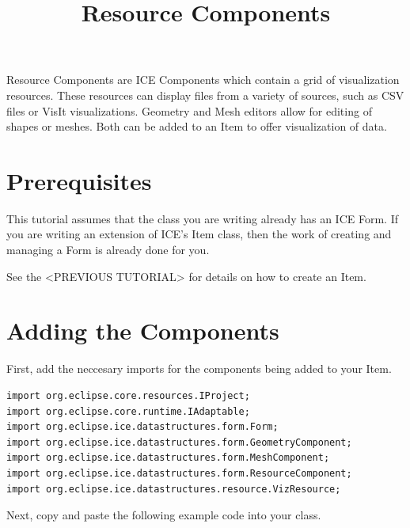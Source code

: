 \documentclass{article}
\begin{document}
\title{Resource Components}

Resource Components are ICE Components which contain a grid of visualization
resources. These resources can display files from a variety of sources,
such as CSV files or VisIt visualizations. Geometry and Mesh editors allow for
editing of shapes or meshes. Both can be added to an Item to offer visualization
of data.

\section{Prerequisites}

This tutorial assumes that the class you are writing already has an ICE Form. If
you are writing an extension of ICE's Item class, then the work of creating and
managing a Form is already done for you.

See the <PREVIOUS TUTORIAL> for details on how to create an Item.

\section{Adding the Components}

First, add the neccesary imports for the components being added to your Item. 

\begin{verbatim}
import org.eclipse.core.resources.IProject;
import org.eclipse.core.runtime.IAdaptable;
import org.eclipse.ice.datastructures.form.Form;
import org.eclipse.ice.datastructures.form.GeometryComponent;
import org.eclipse.ice.datastructures.form.MeshComponent;
import org.eclipse.ice.datastructures.form.ResourceComponent;
import org.eclipse.ice.datastructures.resource.VizResource;
\end{verbatim}

Next, copy and paste the following example code into your class.
\end{document}
